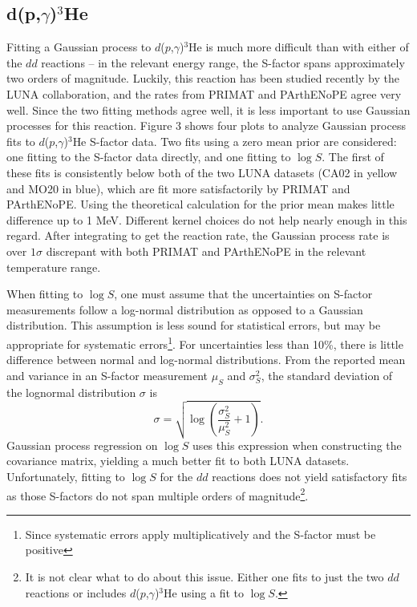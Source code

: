 \documentclass[%
 reprint,
superscriptaddress,
nofootinbib,
 amsmath,amssymb,
 aps,
 pra,
]{revtex4-2}
\begin{document}
\subsection{d(p,$\gamma$)$^3$He}

Fitting a Gaussian process to $d$($p$,$\gamma$)$^3$He is much more difficult than with either of the $dd$ reactions -- in the relevant energy range, the S-factor spans approximately two orders of magnitude. Luckily, this reaction has been studied recently by the LUNA collaboration, and the rates from PRIMAT and PArthENoPE agree very well. Since the two fitting methods agree well, it is less important to use Gaussian processes for this reaction. Figure 3 shows four plots to analyze Gaussian process fits to $d$($p$,$\gamma$)$^3$He S-factor data. Two fits using a zero mean prior are considered: one fitting to the S-factor data directly, and one fitting to $\log S$. The first of these fits is consistently below both of the two LUNA datasets \cite{Casella2002, Mossa2020} (CA02 in yellow and MO20 in blue), which are fit more satisfactorily by PRIMAT and PArthENoPE. Using the theoretical calculation for the prior mean makes little difference up to 1 MeV. Different kernel choices do not help nearly enough in this regard. After integrating to get the reaction rate, the Gaussian process rate is over $1\sigma$ discrepant with both PRIMAT and PArthENoPE in the relevant temperature range. 

When fitting to $\log S$, one must assume that the uncertainties on S-factor measurements follow a log-normal distribution as opposed to a Gaussian distribution. This assumption is less sound for statistical errors, but may be appropriate for systematic errors\footnote{Since systematic errors apply multiplicatively and the S-factor must be positive}. For uncertainties less than 10\%, there is little difference between normal and log-normal distributions. From the reported mean and variance in an S-factor measurement $\mu_S$ and $\sigma_S^2$, the standard deviation of the lognormal distribution $\sigma$ is 
\begin{equation}
	\sigma = \sqrt{\log \left(\frac{\sigma_S^2}{\mu_S^2} + 1 \right)}. \nonumber
\end{equation}	
Gaussian process regression on $\log S$ uses this expression when constructing the covariance matrix, yielding a much better fit to both LUNA datasets. Unfortunately, fitting to $\log S$ for the $dd$ reactions does not yield satisfactory fits as those S-factors do not span multiple orders of magnitude\footnote{It is not clear what to do about this issue. Either one fits to just the two $dd$ reactions or includes $d$($p$,$\gamma$)$^3$He using a fit to $\log S$.}. 
\end{document}
